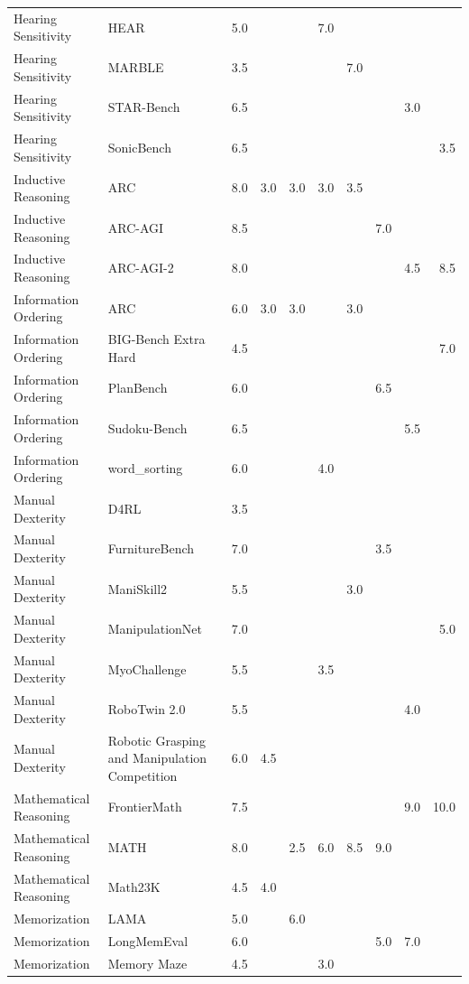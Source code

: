 \begin{longtable}{lp{4.6cm}rrrrrrrr}
Hearing Sensitivity & HEAR & 5.0 &  &  & 7.0 &  &  &  &  \\
Hearing Sensitivity & MARBLE & 3.5 &  &  &  & 7.0 &  &  &  \\
Hearing Sensitivity & STAR-Bench & 6.5 &  &  &  &  &  & 3.0 &  \\
Hearing Sensitivity & SonicBench & 6.5 &  &  &  &  &  &  & 3.5 \\
Inductive Reasoning & ARC & 8.0 & 3.0 & 3.0 & 3.0 & 3.5 &  &  &  \\
Inductive Reasoning & ARC-AGI & 8.5 &  &  &  &  & 7.0 &  &  \\
Inductive Reasoning & ARC-AGI-2 & 8.0 &  &  &  &  &  & 4.5 & 8.5 \\
Information Ordering & ARC & 6.0 & 3.0 & 3.0 &  & 3.0 &  &  &  \\
Information Ordering & BIG-Bench Extra Hard & 4.5 &  &  &  &  &  &  & 7.0 \\
Information Ordering & PlanBench & 6.0 &  &  &  &  & 6.5 &  &  \\
Information Ordering & Sudoku-Bench & 6.5 &  &  &  &  &  & 5.5 &  \\
Information Ordering & word\_sorting & 6.0 &  &  & 4.0 &  &  &  &  \\
Manual Dexterity & D4RL & 3.5 &  &  &  &  &  &  &  \\
Manual Dexterity & FurnitureBench & 7.0 &  &  &  &  & 3.5 &  &  \\
Manual Dexterity & ManiSkill2 & 5.5 &  &  &  & 3.0 &  &  &  \\
Manual Dexterity & ManipulationNet & 7.0 &  &  &  &  &  &  & 5.0 \\
Manual Dexterity & MyoChallenge & 5.5 &  &  & 3.5 &  &  &  &  \\
Manual Dexterity & RoboTwin 2.0 & 5.5 &  &  &  &  &  & 4.0 &  \\
Manual Dexterity & Robotic Grasping and Manipulation Competition & 6.0 & 4.5 &  &  &  &  &  &  \\
Mathematical Reasoning & FrontierMath & 7.5 &  &  &  &  &  & 9.0 & 10.0 \\
Mathematical Reasoning & MATH & 8.0 &  & 2.5 & 6.0 & 8.5 & 9.0 &  &  \\
Mathematical Reasoning & Math23K & 4.5 & 4.0 &  &  &  &  &  &  \\
Memorization & LAMA & 5.0 &  & 6.0 &  &  &  &  &  \\
Memorization & LongMemEval & 6.0 &  &  &  &  & 5.0 & 7.0 &  \\
Memorization & Memory Maze & 4.5 &  &  & 3.0 &  &  &  &  \\

\end{longtable}
